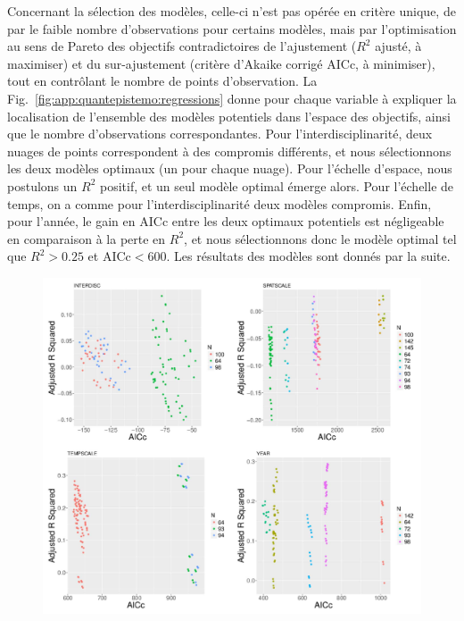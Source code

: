 Concernant la sélection des modèles, celle-ci n'est pas opérée en critère unique, de par le faible nombre d'observations pour certains modèles, mais par l'optimisation au sens de Pareto des objectifs contradictoires de l'ajustement ($R^2$ ajusté, à maximiser) et du sur-ajustement (critère d'Akaike corrigé AICc, à minimiser), tout en contrôlant le nombre de points d'observation. La Fig.~\ref{fig:app:quantepistemo:regressions} donne pour chaque variable à expliquer la localisation de l'ensemble des modèles potentiels dans l'espace des objectifs, ainsi que le nombre d'observations correspondantes. Pour l'interdisciplinarité, deux nuages de points correspondent à des compromis différents, et nous sélectionnons les deux modèles optimaux (un pour chaque nuage). Pour l'échelle d'espace, nous postulons un $R^2$ positif, et un seul modèle optimal émerge alors. Pour l'échelle de temps, on a comme pour l'interdisciplinarité deux modèles compromis. Enfin, pour l'année, le gain en AICc entre les deux optimaux potentiels est négligeable en comparaison à la perte en $R^2$, et nous sélectionnons donc le modèle optimal tel que $R^2>0.25$ et AICc$<600$. Les résultats des modèles sont donnés par la suite.


\begin{figure}
\includegraphics[width=\linewidth]{Figures/Final/A-quantepistemo-regressions.jpg}
\end{figure}



